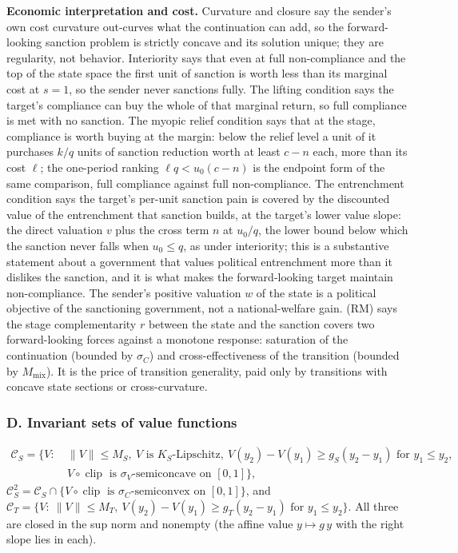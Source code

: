 \textbf{Economic interpretation and cost.} Curvature and closure say the sender's
own cost curvature out-curves what the continuation can add, so the
forward-looking sanction problem is strictly concave and its solution
unique; they are regularity, not behavior. Interiority says that even at
full non-compliance and the top of the state space the first unit of sanction is
worth less than its marginal cost at $s=1$, so the sender never sanctions
fully. The lifting condition says the target's compliance can buy the whole of that
marginal return, so full compliance is met with no sanction. The myopic relief condition says
that at the stage, compliance is worth buying at the margin: below the
relief level a unit of it purchases $k/q$ units of sanction reduction worth at least
$c-n$ each, more than its cost $\ell$; the one-period ranking $\ell q<u_0(c-n)$ is the
endpoint form of the same comparison, full compliance against full non-compliance. The entrenchment condition says the
target's per-unit sanction pain is covered by the discounted value of the
entrenchment that sanction builds, at the target's lower value slope: the
direct valuation $v$ plus the cross term $n$ at $u_0/q$, the lower bound below which
the sanction never falls when $u_0\le q$, as under interiority; this is
a substantive statement about a government that values political
entrenchment more than it dislikes the sanction, and it is what makes the
forward-looking target maintain non-compliance. The sender's positive valuation $w$ of the
state is a political objective of the sanctioning government, not a
national-welfare gain. (RM) says the stage complementarity $r$ between the
state and the sanction covers two forward-looking forces against a monotone
response: saturation of the continuation (bounded by $\sigma_C$) and
cross-effectiveness of the transition (bounded by $M_{\mathrm{mix}}$). It is the
price of transition generality, paid only by transitions with concave state
sections or cross-curvature.

\subsubsection*{D. Invariant sets of value functions}
\[
\begin{aligned}
\mathcal C_S=\{V:\ &\|V\|\le M_S,\ V\text{ is }K_S\text{-Lipschitz},\
V(y_2)-V(y_1)\ge g_S(y_2-y_1)\text{ for }y_1\le y_2,\\
&V\circ\operatorname{clip}\text{ is }\sigma_V\text{-semiconcave on }[0,1]\},
\end{aligned}
\]
$\mathcal C_S^2=\mathcal C_S\cap\{V\circ\operatorname{clip}\text{ is }\sigma_C\text{-semiconvex on }[0,1]\}$,
and
$\mathcal C_T=\{V:\ \|V\|\le M_T,\ V(y_2)-V(y_1)\ge g_T(y_2-y_1)\text{ for }y_1\le y_2\}$.
All three are closed in the sup norm and nonempty (the affine value
$y\mapsto g\,y$ with the right slope lies in each).

